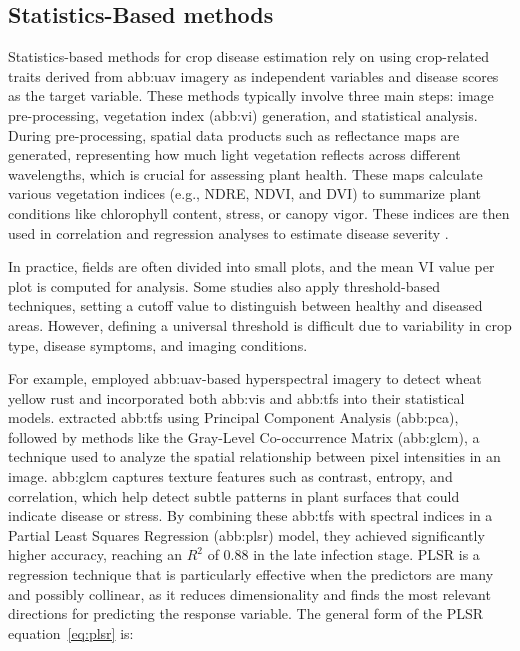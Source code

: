 \subsection{Statistics-Based methods}
Statistics-based methods for crop disease estimation rely on using crop-related traits derived from \gls{abb:uav} imagery as independent variables and disease scores as the target variable. These methods typically involve three main steps: image pre-processing, vegetation index (\gls{abb:vi}) generation, and statistical analysis. During pre-processing, spatial data products such as reflectance maps are generated, representing how much light vegetation reflects across different wavelengths, which is crucial for assessing plant health. These maps calculate various vegetation indices (e.g., NDRE, NDVI, and DVI) to summarize plant conditions like chlorophyll content, stress, or canopy vigor. These indices are then used in correlation and regression analyses to estimate disease severity \parencite{shahi2023recent}.

In practice, fields are often divided into small plots, and the mean VI value per plot is computed for analysis. Some studies also apply threshold-based techniques, setting a cutoff value to distinguish between healthy and diseased areas. However, defining a universal threshold is difficult due to variability in crop type, disease symptoms, and imaging conditions.

For example, \parencite{guo2021wheat} employed \gls{abb:uav}-based hyperspectral imagery to detect wheat yellow rust and incorporated both  \gls{abb:vi}s and  \gls{abb:tf}s into their statistical models. \parencite{guo2021wheat} extracted \gls{abb:tf}s using Principal Component Analysis (\gls{abb:pca}), followed by methods like the Gray-Level Co-occurrence Matrix (\gls{abb:glcm}), a technique used to analyze the spatial relationship between pixel intensities in an image. \gls{abb:glcm} captures texture features such as contrast, entropy, and correlation, which help detect subtle patterns in plant surfaces that could indicate disease or stress. By combining these \gls{abb:tf}s with spectral indices in a Partial Least Squares Regression (\gls{abb:plsr}) model, they achieved significantly higher accuracy, reaching an \( R^2 \) of 0.88 in the late infection stage.
PLSR is a regression technique that is particularly effective when the predictors are many and possibly collinear, as it reduces dimensionality and finds the most relevant directions for predicting the response variable. The general form of the PLSR equation~\eqref{eq:plsr} is:

